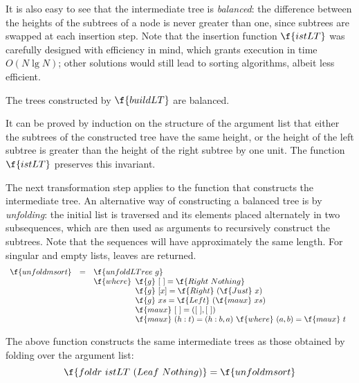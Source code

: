 \documentclass[a4paper,11pt]{llncs}
\begin{document}
It is also easy to see that the intermediate tree is \emph{balanced}:
the difference between the heights of the subtrees of a node is never
greater than one, since subtrees are swapped at each insertion
step. Note that the insertion function $\f{istLT}$ was carefully
designed with efficiency in mind, which grants execution in time $O(N
\lg N)$; other solutions would still lead to sorting algorithms,
albeit less efficient.


\begin{proposition}
  The trees constructed by $\f{buildLT}$ are balanced.
\end{proposition}

\proof 
It can be proved by induction on the structure of the argument list
that either the subtrees of the constructed tree have the same height,
or the height of the left subtree is greater than the height of the
right subtree by one unit. The function $\f{istLT}$ preserves this
invariant.
\endproof

The next transformation step applies to the function that constructs
the intermediate tree.  An alternative way of constructing a balanced
tree is by \emph{unfolding}: the initial list is traversed and its
elements placed alternately in two subsequences, which are then used
as arguments to recursively construct the subtrees. Note that the
sequences will have approximately the same length. For singular and
empty lists, leaves are returned.
$$
\begin{array}{rcl}
  \f{unfoldmsort} & = & \f{unfoldLTree\ g}\\
  && \f{where} 
             \begin{array}[t]{l}
             \f{g}\ [\ ]  = \f{Right\ Nothing}\\
             \f{g}\ [x] = \f{Right}\ (\f{Just}\ x)\\
             \f{g}\ xs  = \f{Left}\ (\f{maux}\ xs)\\
             \f{maux}\ [\ ]     = ([\ ],[\ ])\\
             \f{maux}\ (h:t) = (h:b,a)\  \f{where}\ (a,b) = \f{maux}\ t\\
           \end{array}
         \end{array}
$$

\begin{proposition} The above function constructs the same
  intermediate trees as those obtained by folding over the argument
  list:
  $$
  \f{foldr\ istLT\ (Leaf\ Nothing)} = \f{unfoldmsort}
  $$
\end{proposition}
\end{document}
